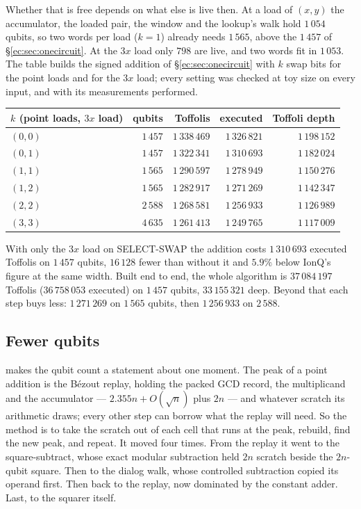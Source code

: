 \documentclass[11pt]{article}
\theoremstyle{plain}
\theoremstyle{remark}
\begin{document}
Whether that is free depends on what else is live then. At a load of $(x,y)$ the accumulator, the
loaded pair, the window and the lookup's walk hold $1\,054$ qubits, so two words per load
($k=1$) already needs $1\,565$, above the $1\,457$ of \S\ref{ec:sec:onecircuit}. At the
$3x$ load only $798$ are live, and two words fit in $1\,053$. The table builds the
signed addition of \S\ref{ec:sec:onecircuit} with $k$ swap bits for the point loads and for the $3x$
load; every setting was checked at toy size on every input, and with its measurements performed.

\begin{center}\small
\begin{tabular}{lrrrr}
\toprule
$k$ (point loads, $3x$ load) & qubits & Toffolis & executed & Toffoli depth\\
\midrule
$(0, 0)$ & $1\,457$ & $1\,338\,469$ & $1\,326\,821$ & $1\,198\,152$\\
$(0, 1)$ & $1\,457$ & $1\,322\,341$ & $1\,310\,693$ & $1\,182\,024$\\
$(1, 1)$ & $1\,565$ & $1\,290\,597$ & $1\,278\,949$ & $1\,150\,276$\\
$(1, 2)$ & $1\,565$ & $1\,282\,917$ & $1\,271\,269$ & $1\,142\,347$\\
$(2, 2)$ & $2\,588$ & $1\,268\,581$ & $1\,256\,933$ & $1\,126\,989$\\
$(3, 3)$ & $4\,635$ & $1\,261\,413$ & $1\,249\,765$ & $1\,117\,009$\\
\bottomrule
\end{tabular}
\end{center}

With only the $3x$ load on SELECT-SWAP the addition costs $1\,310\,693$ executed Toffolis on
$1\,457$ qubits, $16\,128$ fewer than without it and $5.9\%$ below IonQ's
figure at the same width. Built end to end, the whole algorithm is $37\,084\,197$ Toffolis
($36\,758\,053$ executed) on $1\,457$ qubits, $33\,155\,321$ deep. Beyond that each
step buys less: $1\,271\,269$ on $1\,565$ qubits, then $1\,256\,933$ on $2\,588$.

\subsection{Fewer qubits}\label{ec:sec:fewq}

\cite{ec:schrott26} makes the qubit count a statement about one moment. The peak of a point
addition is the B\'ezout replay, holding the packed GCD record, the multiplicand and the
accumulator --- $2.355n+O(\sqrt n)$ plus $2n$ --- and whatever scratch its arithmetic draws; every
other step can borrow what the replay will need. So the method is to take the scratch out of each
cell that runs at the peak, rebuild, find the new peak, and repeat. It moved four times. From the
replay it went to the square-subtract, whose exact modular subtraction held $2n$ scratch beside the
$2n$-qubit square. Then to the dialog walk, whose controlled subtraction copied its operand first.
Then back to the replay, now dominated by the constant adder. Last, to the squarer itself.
\end{document}
